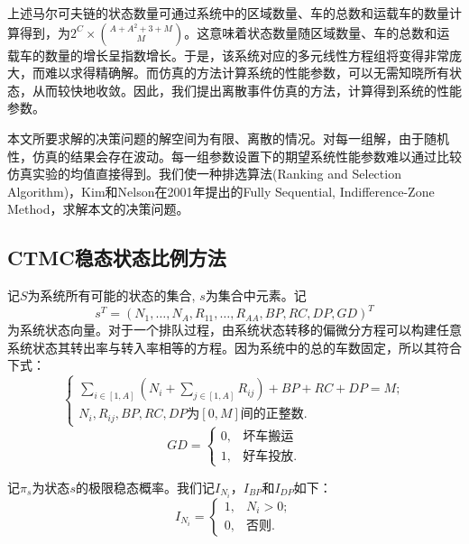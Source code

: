 \documentclass{article}
\begin{document}
上述马尔可夫链的状态数量可通过系统中的区域数量、车的总数和运载车的数量计算得到，为$ 2^C \times \binom{A+A^2+3+M}{M}$。这意味着状态数量随区域数量、车的总数和运载车的数量的增长呈指数增长。于是，该系统对应的多元线性方程组将变得非常庞大，而难以求得精确解。而仿真的方法计算系统的性能参数，可以无需知晓所有状态，从而较快地收敛。因此，我们提出离散事件仿真的方法，计算得到系统的性能参数。

本文所要求解的决策问题的解空间为有限、离散的情况。对每一组解，由于随机性，仿真的结果会存在波动。每一组参数设置下的期望系统性能参数难以通过比较仿真实验的均值直接得到。我们使一种排选算法(Ranking and Selection Algorithm)，Kim和Nelson在2001年提出的Fully Sequential, Indifference-Zone Method，求解本文的决策问题。

\subsection{CTMC稳态状态比例方法}
记$S$为系统所有可能的状态的集合, $s$为集合中元素。记$$s^{T} = (N_1, \dots, N_A, R_{11}, \dots, R_{AA}, BP, RC, DP, GD)^{T}$$为系统状态向量。对于一个排队过程，由系统状态转移的偏微分方程可以构建任意系统状态其转出率与转入率相等的方程。因为系统中的总的车数固定，所以其符合下式：
\begin{equation}
    \left\{
        \begin{array}{lcl}
            \sum \limits _{i \in [1,A]}(N_i+\sum \limits _{j \in [1,A]}R_{ij})+BP+RC+DP = M; \\
            N_i, R_{ij}, BP, RC, DP\mbox{为}[0,M]\mbox{间的正整数}.
        \end{array}
    \right .
\end{equation}
\begin{equation}
    GD = \left\{
        \begin{array}{lcl}
            0, &\mbox{坏车搬运} \\
            1, &\mbox{好车投放}.
        \end{array}
    \right .
\end{equation}

记$\pi_s$为状态$s$的极限稳态概率。我们记$I_{N_i}$，$I_{BP}$和$I_{DP}$如下：
\begin{equation}
I_{N_i}=\left\{
    \begin{array}{lcl}
        1, &N_i > 0;\\
        0, &\mbox{否则}.
    \end{array}    
\right.
\end{equation}
\end{document}
